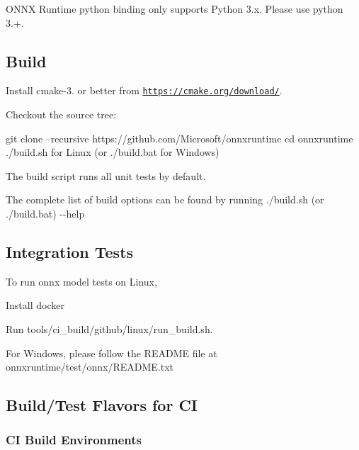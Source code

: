O\+N\+NX Runtime python binding only supports Python 3.\+x. Please use python 3.+.

\subsection*{Build}

Install cmake-\/3. or better from \href{https://cmake.org/download/}{\tt https\+://cmake.\+org/download/}.

Checkout the source tree\+: 
\begin{DoxyCode}
git clone --recursive https://github.com/Microsoft/onnxruntime
cd onnxruntime
./build.sh for Linux (or ./build.bat for Windows)
\end{DoxyCode}
 The build script runs all unit tests by default.

The complete list of build options can be found by running {\ttfamily ./build.sh (or ./build.bat) -\/-\/help}

\subsection*{Integration Tests}

To run onnx model tests on Linux,


\begin{DoxyEnumerate}
\item Install docker
\item Run tools/ci\+\_\+build/github/linux/run\+\_\+build.\+sh.
\end{DoxyEnumerate}

For Windows, please follow the R\+E\+A\+D\+ME file at onnxruntime/test/onnx/\+R\+E\+A\+D\+M\+E.\+txt

\subsection*{Build/\+Test Flavors for CI}

\subsubsection*{CI Build Environments}

